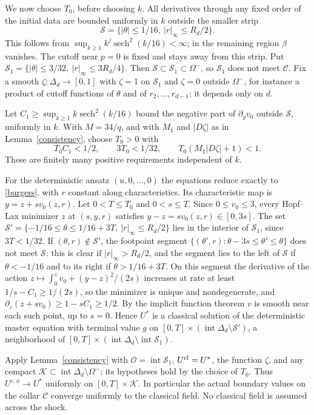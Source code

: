 \documentclass[11pt]{article}
\newcommand{\eps}{\varepsilon}
\begin{document}
We now choose $T_0$, before choosing $k$. All derivatives through any fixed order of the initial data are bounded uniformly in $k$ outside the smaller strip
\[
 \mathcal S=\{|\theta|\le1/16,\ |r|_\infty\le R_d/2\}.
\]
This follows from $\sup_{k\ge1}k^j\operatorname{sech}^2(k/16)<\infty$; in the remaining region $\beta$ vanishes. The cutoff near $p=0$ is fixed and stays away from this strip. Put $\mathcal S_1=\{|\theta|\le3/32,\ |r|_\infty\le3R_d/4\}$. Then $\mathcal S\subset\mathcal S_1\subset\Omega^-$, so $\mathcal S_1$ does not meet $\mathcal C$. Fix a smooth $\zeta:\Delta_d\to[0,1]$ with $\zeta=1$ on $\mathcal S_1$ and $\zeta=0$ outside $\Omega^-$, for instance a product of cutoff functions of $\theta$ and of $r_2,\ldots,r_{d-1}$; it depends only on $d$.

Let $C_1\ge\sup_{k\ge1}k\operatorname{sech}^2(k/16)$ bound the negative part of $\partial_yv_0$ outside $\mathcal S$, uniformly in $k$. With $M=34/q$, and with $M_1$ and $|D\zeta|$ as in Lemma~\ref{consistency}, choose $T_0>0$ with
\[
 T_0C_1<1/2,\qquad 3T_0<1/32,\qquad T_0(M_1|D\zeta|+1)<1.
\]
These are finitely many positive requirements independent of $k$.

For the deterministic ansatz $(u,0,\ldots,0)$ the equations reduce exactly to \eqref{burgers}, with $r$ constant along characteristics. Its characteristic map is $y=z+sv_0(z,r)$. Let $0<T\le T_0$ and $0<s\le T$. Since $0\le v_0\le3$, every Hopf--Lax minimizer $z$ at $(s,y,r)$ satisfies $y-z=sv_0(z,r)\in[0,3s]$. The set $\mathcal S'=\{-1/16\le\theta\le1/16+3T,\ |r|_\infty\le R_d/2\}$ lies in the interior of $\mathcal S_1$, since $3T<1/32$. If $(\theta,r)\notin\mathcal S'$, the footpoint segment $\{(\theta',r):\theta-3s\le\theta'\le\theta\}$ does not meet $\mathcal S$: this is clear if $|r|_\infty>R_d/2$, and the segment lies to the left of $\mathcal S$ if $\theta<-1/16$ and to its right if $\theta>1/16+3T$. On this segment the derivative of the action $z\mapsto\int_0^zv_0+(y-z)^2/(2s)$ increases at rate at least $1/s-C_1\ge1/(2s)$, so the minimizer is unique and nondegenerate, and $\partial_z(z+sv_0)\ge1-sC_1\ge1/2$. By the implicit function theorem $v$ is smooth near each such point, up to $s=0$. Hence $U^*$ is a classical solution of the deterministic master equation with terminal value $g$ on $[0,T]\times(\operatorname{int}\Delta_d\setminus\mathcal S')$, a neighborhood of $[0,T]\times(\operatorname{int}\Delta_d\setminus\operatorname{int}\mathcal S_1)$.

Apply Lemma~\ref{consistency} with $\mathcal O=\operatorname{int}\mathcal S_1$, $U^{\rm cl}=U^*$, the function $\zeta$, and any compact $\mathcal K\subset\operatorname{int}\Delta_d\setminus\Omega^-$; its hypotheses hold by the choice of $T_0$. Thus $U^{\eps,\phi}\to U^*$ uniformly on $[0,T]\times\mathcal K$. In particular the actual boundary values on the collar $\mathcal C$ converge uniformly to the classical field. No classical field is assumed across the shock.
\end{document}

